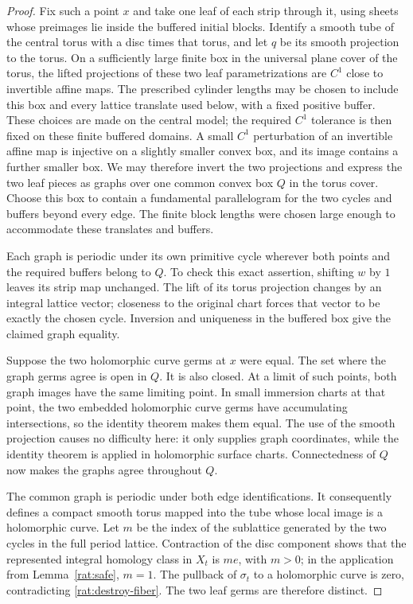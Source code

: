 \begin{proof}
Fix such a point $x$ and take one leaf of each strip through it,
using sheets whose preimages lie inside the buffered initial
blocks. Identify a smooth tube of the central torus with a disc
times that torus, and let $q$ be its smooth projection to the
torus. On a sufficiently large finite box in the universal plane
cover of the torus, the lifted projections of these two leaf
parametrizations are $C^1$ close to invertible affine maps.
The prescribed cylinder lengths may be chosen to include this
box and every lattice translate used below, with a fixed positive
buffer. These choices are made on the central model; the required
$C^1$ tolerance is then fixed on these finite buffered domains.
A small $C^1$ perturbation of an invertible affine map
is injective on a slightly smaller convex box, and its image
contains a further smaller box. We may therefore invert the
two projections and express the two leaf pieces as graphs over
one common convex box $Q$ in the torus cover. Choose this box to
contain a fundamental parallelogram for the two cycles and buffers
beyond every edge. The finite block lengths were chosen large
enough to accommodate these translates and buffers.

Each graph is periodic under its own primitive cycle wherever
both points and the required buffers belong to $Q$. To check
this exact assertion, shifting $w$ by $1$ leaves its strip map
unchanged. The lift of its torus projection changes by an
integral lattice vector; closeness to the original chart forces
that vector to be exactly the chosen cycle. Inversion and
uniqueness in the buffered box give the claimed graph equality.

Suppose the two holomorphic curve germs at $x$ were equal. The
set where the graph germs agree is open in $Q$. It is also
closed. At a limit of such points, both graph images have the
same limiting point. In small immersion charts at that point,
the two embedded holomorphic curve germs have accumulating
intersections, so the identity theorem makes them equal.
The use of the smooth projection causes no difficulty here:
it only supplies graph coordinates, while the identity theorem
is applied in holomorphic surface charts. Connectedness of $Q$
now makes the graphs agree throughout $Q$.

The common graph is
periodic under both edge identifications. It consequently
defines a compact smooth torus mapped into the tube whose local
image is a holomorphic curve. Let $m$ be the index of the
sublattice generated by the two cycles in the full period
lattice. Contraction of the disc component shows that the
represented integral homology class in $X_t$ is $m e$, with
$m>0$; in the application from Lemma~\ref{rat:safe}, $m=1$.
The pullback of $\sigma_t$ to a holomorphic curve is zero,
contradicting
\eqref{rat:destroy-fiber}. The two leaf germs are therefore
distinct.


\end{proof}
